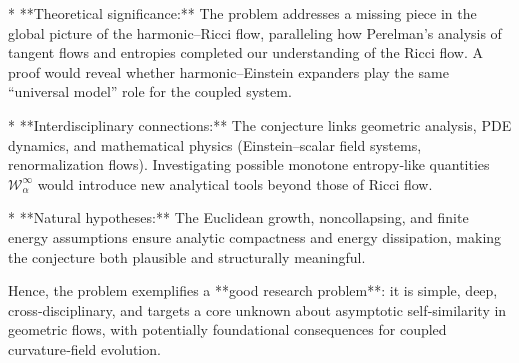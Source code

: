 * **Theoretical significance:** The problem addresses a missing piece in the global picture of the harmonic–Ricci flow, paralleling how Perelman’s analysis of tangent flows and entropies completed our understanding of the Ricci flow.  A proof would reveal whether harmonic–Einstein expanders play the same “universal model” role for the coupled system.

* **Interdisciplinary connections:** The conjecture links geometric analysis, PDE dynamics, and mathematical physics (Einstein–scalar field systems, renormalization flows).  Investigating possible monotone entropy‑like quantities \(\mathcal{W}_\alpha^{\infty}\) would introduce new analytical tools beyond those of Ricci flow.

* **Natural hypotheses:** The Euclidean growth, noncollapsing, and finite energy assumptions ensure analytic compactness and energy dissipation, making the conjecture both plausible and structurally meaningful.

Hence, the problem exemplifies a **good research problem**: it is simple, deep, cross‑disciplinary, and targets a core unknown about asymptotic self‑similarity in geometric flows, with potentially foundational consequences for coupled curvature‑field evolution.